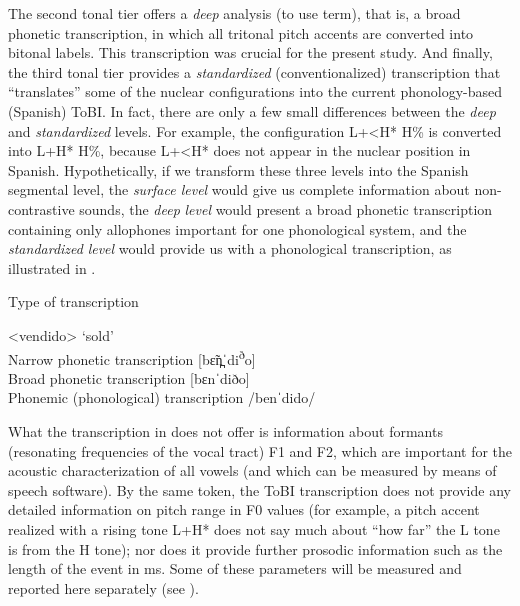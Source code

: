 The second tonal tier offers a \textit{deep} analysis (to use  term), that is, a broad phonetic transcription, in which all tritonal pitch accents are converted into bitonal labels. This transcription was crucial for the present study. And finally, the third tonal tier provides a \textit{standardized} (conventionalized) transcription that “translates” some of the nuclear configurations into the current phonology-based (Spanish) ToBI. In fact, there are only a few small differences between the \textit{deep} and \textit{standardized} levels. For example, the configuration L+<H* H\% is converted into L+H* H\%, because L+<H* does not appear in the nuclear position in Spanish. Hypothetically, if we transform these three levels into the Spanish segmental level, the \textit{surface level} would give us complete information about non-contrastive sounds, the \textit{deep} \textit{level} would present a broad phonetic transcription containing only allophones important for one phonological system, and the \textit{standardized} \textit{level} would provide us with a phonological transcription, as illustrated in .


\ea\label{ex:3:2}  Type of transcription

      {\normalfont<vendido> ‘sold’}\\
{Narrow phonetic transcription}    [bɛ̃n̪ˈdi\textsuperscript{ð}o]\\
{Broad phonetic transcription}      [bɛnˈdiðo]\\
{Phonemic (phonological) transcription}   /benˈdido/\\
\z



What the transcription in  does not offer is information about formants (resonating frequencies of the vocal tract) F1 and F2, which are important for the acoustic characterization of all vowels (and which can be measured by means of speech software). By the same token, the ToBI transcription does not provide any detailed information on pitch range in F0 values (for example, a pitch accent realized with a rising tone L+H* does not say much about “how far” the L tone is from the H tone); nor does it provide further prosodic information such as the length of the event in ms. Some of these parameters will be measured and reported here separately (see ).



